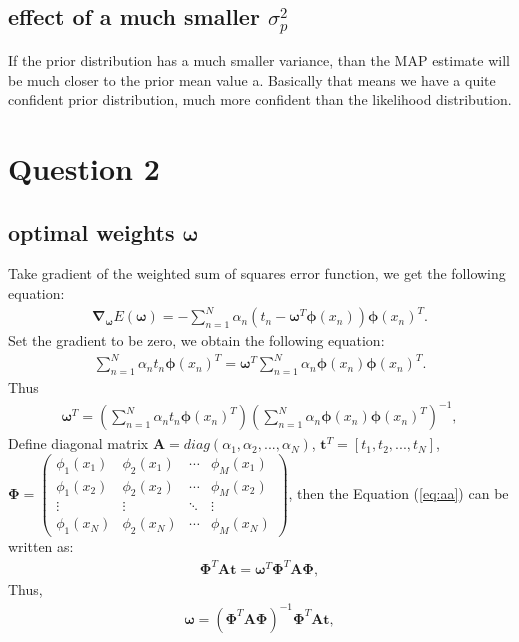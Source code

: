 \documentclass[paper=a4, fontsize=11pt]{article} %
\begin{document}
\subsection{effect of a much smaller $\sigma^2_p$}
If the prior distribution has a much smaller variance, than the MAP estimate will be much closer to the prior mean value a. Basically that means we have a quite confident prior distribution, much more confident than the likelihood distribution.


\section{Question 2}
\subsection{optimal weights $\boldsymbol{\omega}$}


Take gradient of the weighted sum of squares error function, we get the following equation:
\begin{align}
\boldsymbol{\nabla}_{\boldsymbol{\omega}} E(\boldsymbol{\omega})  = -\sum_{n=1}^N \alpha_n (t_n -\boldsymbol{\omega}^T \boldsymbol{\phi}(x_n) ) \boldsymbol{\phi}(x_n)^T.
\end{align}
Set the gradient to be zero, we obtain the following equation:
\begin{align}\label{eq:aa}
\sum_{n=1}^N \alpha_n t_n \boldsymbol{\phi}(x_n)^T 
= 
\boldsymbol{\omega}^T \sum_{n=1}^N \alpha_n  \boldsymbol{\phi}(x_n)  \boldsymbol{\phi}(x_n)^T.
\end{align}
Thus
\begin{align}
\boldsymbol{\omega}^T
= (\sum_{n=1}^N \alpha_n t_n \boldsymbol{\phi}(x_n)^T )
(\sum_{n=1}^N \alpha_n  \boldsymbol{\phi}(x_n)  \boldsymbol{\phi}(x_n)^T)^{-1},
\end{align}
Define diagonal matrix $\textbf{A} = diag(\alpha_1, \alpha_2,...,\alpha_N)$, 
$\textbf{t}^T =[t_1,t_2,...,t_N]$,\\
$\boldsymbol{\Phi} = 
 \begin{pmatrix}
  \phi_1(x_1) & \phi_2(x_1) & \cdots & \phi_M(x_1) \\
  \phi_1(x_2) & \phi_2(x_2) & \cdots & \phi_M(x_2)\\
  \vdots  & \vdots  & \ddots & \vdots  \\
  \phi_1(x_N) & \phi_2(x_N) & \cdots & \phi_M(x_N)
 \end{pmatrix}$, then the Equation (\ref{eq:aa}) can be written as:
\begin{align}
\boldsymbol{\Phi}^T \textbf{A}  \boldsymbol{t} 
= \boldsymbol{\omega}^T 
\boldsymbol {\Phi}^T \textbf{A} \boldsymbol{\Phi},
\end{align}
Thus,
\begin{align}
\boldsymbol{\omega} =
(\boldsymbol {\Phi}^T \textbf{A} \boldsymbol{\Phi})^{-1}
\boldsymbol{\Phi}^T \textbf{A}  \boldsymbol{t} ,
\end{align}
\end{document}
